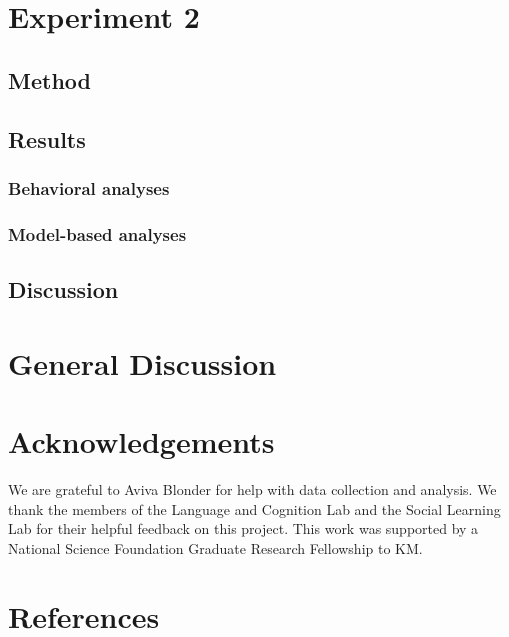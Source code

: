 \documentclass[10pt, letterpaper]{article}
\begin{document}
\section{Experiment 2}\label{experiment-2}

\subsection{Method}\label{method-1}

\subsection{Results}\label{results-1}

\subsubsection{Behavioral analyses}\label{behavioral-analyses-1}

\subsubsection{Model-based analyses}\label{model-based-analyses-1}

\subsection{Discussion}\label{discussion-1}

\section{General Discussion}\label{general-discussion}

\section{Acknowledgements}\label{acknowledgements}

We are grateful to Aviva Blonder for help with data collection and
analysis. We thank the members of the Language and Cognition Lab and the
Social Learning Lab for their helpful feedback on this project. This
work was supported by a National Science Foundation Graduate Research
Fellowship to KM.

\section{References}\label{references}

\setlength{\parindent}{-0.1in} \setlength{\leftskip}{0.125in} \noindent
\end{document}
